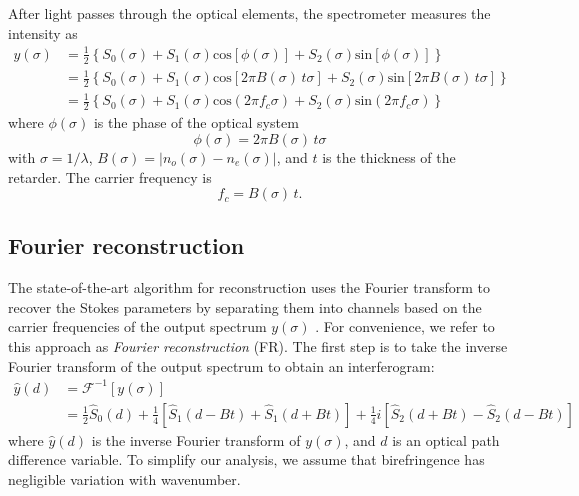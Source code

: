 \documentclass[10pt]{article}
\numberwithin{equation}{subsection}
\begin{document}
After light passes through the optical elements, the spectrometer measures the intensity as
\begin{equation}
    \begin{split}
        y(\sigma) &= \frac{1}{2}\left\{ S_0(\sigma) + S_1(\sigma) \text{cos}[\phi(\sigma)] + S_2(\sigma) \text{sin}[\phi(\sigma)] \right\} \\
        &= \frac{1}{2} \left\{ S_0(\sigma) + S_1(\sigma) \text{cos}[2 \pi B(\sigma) \, t \sigma] + S_2(\sigma) \text{sin}[2 \pi B(\sigma) \, t \sigma] \right\} \\
        &= \frac{1}{2} \left\{ S_0(\sigma) + S_1(\sigma) \text{cos}(2 \pi f_c \sigma) + S_2(\sigma) \text{sin}(2 \pi f_c \sigma) \right\}
    \end{split}
    \label{eqn:ysigma}
\end{equation}
%
where $\phi(\sigma)$ is the phase of the optical system
%
\begin{equation}
\phi(\sigma) = 2 \pi B(\sigma) \, t \sigma
\label{eqn:phi}
\end{equation}
%
with $ \sigma = 1/\lambda $, $ B(\sigma) = | n_o(\sigma) -
n_e(\sigma) | $, and $t$ is the thickness of the retarder. The carrier frequency is
%
\begin{equation}
    f_c = B(\sigma) \, t.
    \label{fc}
\end{equation}

\subsection{Fourier reconstruction}\label{sectionFR}

The state-of-the-art algorithm for reconstruction uses the Fourier transform to recover the Stokes parameters by separating them into channels based on the carrier frequencies of the output spectrum $y(\sigma)$ \cite{Kudenov07}.
For convenience, we refer to this approach as \emph{Fourier reconstruction} (FR).
The first step is to take the inverse Fourier transform of the output spectrum to obtain an interferogram:
\begin{equation}
    \begin{split}
        \widehat{y}(d) &= \mathcal F^{-1} [y(\sigma)] \\
        &= \frac{1}{2} \widehat{S}_0(d) + \frac{1}{4} \left[\widehat{S}_1(d - Bt) + \widehat{S}_1(d + Bt)\right] + \frac{1}{4} i \left[\widehat{S}_2(d + Bt) - \widehat{S}_2(d - Bt)\right]
    \end{split}
\end{equation}
where $\widehat{y}(d)$ is the inverse Fourier transform of $y(\sigma)$, and $d$ is an optical path difference variable.
To simplify our analysis, we assume that birefringence has negligible variation with wavenumber.
%
\end{document}

